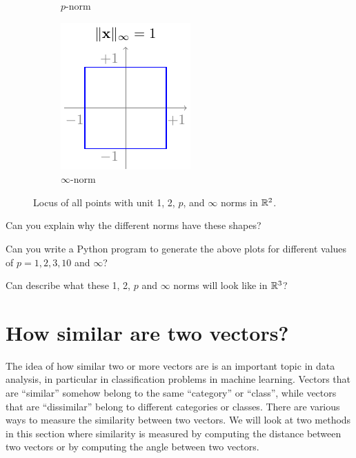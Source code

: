 \begin{figure}[h]
\begin{subfigure}[b]{0.24\textwidth}
        \caption{$p$-norm}
        \label{fig:ch01-normp}
    \end{subfigure}
    \begin{subfigure}[b]{0.24\textwidth}
        \centering
        \includegraphics{figure/chapter01/norminf.pdf}
        \caption{$\infty$-norm}
        \label{fig:ch01-norminf}
    \end{subfigure}
    \caption{Locus of all points with unit 1, 2, $p$, and $\infty$ norms in $\mathbb{R}^2$.}
\end{figure}

\begin{boxedstuff}
    \begin{problem}
        Can you explain why the different norms have these shapes? 
    \end{problem}
    \begin{problem}
        Can you write a Python program to generate the above plots for different values of $p = 1, 2, 3, 10$ and $\infty$?
    \end{problem}
    \begin{problem}
        Can describe what these 1, 2, $p$ and $\infty$ norms will look like in $\mathbb{R}^3$?
    \end{problem}
\end{boxedstuff}

\section{How similar are two vectors?}\label{sec:ch01-similar-vecs}
The idea of how similar two or more vectors are is an important topic  in data analysis, in particular in classification problems in machine learning. Vectors that are ``similar'' somehow belong to the same ``category'' or ``class'', while vectors that are ``dissimilar'' belong to different categories or classes. There are various ways to measure the similarity between two vectors. We will look at two methods in this section where similarity is measured by computing the distance between two vectors or by computing the angle between two vectors.

